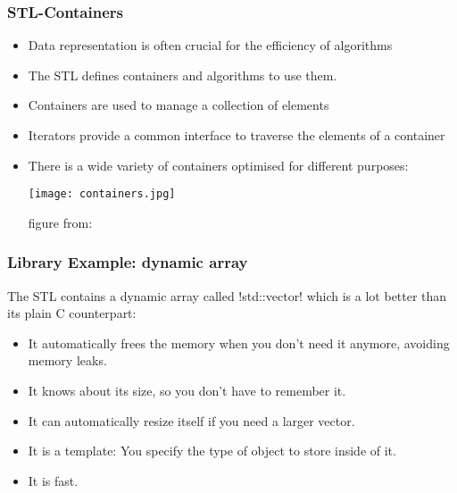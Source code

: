 \begin{frame}
\frametitle{STL-Containers}

\begin{itemize}
\item Data representation is often crucial for the efficiency of algorithms
\item The STL defines containers and algorithms to use them.
\item Containers are used to manage a collection of elements
\item Iterators provide a common interface to traverse the elements of a container
\item There is a wide variety of containers optimised for different purposes:
\begin{center}
\texttt{[image: containers.jpg]}

figure from: \cite{josuttis99:stl}
\end{center}
\end{itemize}

\end{frame}



\begin{frame}
  \frametitle{Library Example: dynamic array}
  The STL contains a dynamic array called \inline!std::vector! which is a lot better than its plain
  C counterpart:
  \begin{itemize}
  \item It automatically frees the memory when you don't need it anymore, avoiding memory leaks.
  \item It knows about its size, so you don't have to remember it.
  \item It can automatically resize itself if you need a larger vector.
  \item It is a template: You specify the type of object to store inside of it.
  \item It is fast.
  \end{itemize}
\end{frame}


